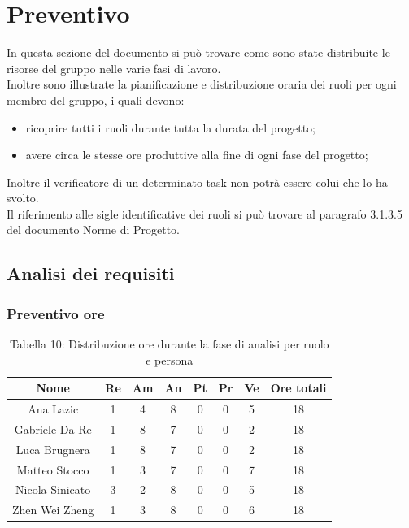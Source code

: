 \section{Preventivo}
In questa sezione del documento si può trovare come sono state distribuite le risorse del gruppo nelle varie fasi di lavoro.\\
Inoltre sono illustrate la pianificazione e distribuzione oraria dei ruoli per ogni membro del gruppo, i quali devono:
\begin{itemize}
	\item ricoprire tutti i ruoli durante tutta la durata del progetto;
	\item avere circa le stesse ore produttive alla fine di ogni fase del progetto;
\end{itemize}
Inoltre il verificatore di un determinato task non potrà essere colui che lo ha svolto.\\
Il riferimento alle sigle identificative dei ruoli si può trovare al paragrafo 3.1.3.5 del documento Norme di Progetto.

\subsection{Analisi dei requisiti}
\subsubsection{Preventivo ore}
\begin{table}[h]
	\setlength\extrarowheight{5pt}
	\centering
	\begin{tabularx}{\textwidth}{|c|c|c|c|c|c|c|c|}
		\hline
		\textbf{Nome} & \textbf{Re} & \textbf{Am} & \textbf{An} & \textbf{Pt} & \textbf{Pr}& \textbf{Ve} & \textbf{Ore totali} \\
		\hline
		Ana Lazic &1&4&8&0&0&5&18 \\
		\hline
		Gabriele Da Re &1&8&7&0&0&2&18 \\
		\hline
		Luca Brugnera &1&8&7&0&0&2&18 \\
		\hline
		Matteo Stocco &1&3&7&0&0&7&18 \\
		\hline
		Nicola Sinicato &3&2&8&0&0&5&18 \\
		\hline
		Zhen Wei Zheng &1&3&8&0&0&6&18 \\
		\hline
	\end{tabularx}
	\vspace{10pt}
	\caption{Tabella 10: Distribuzione ore durante la fase di analisi per ruolo e persona}
\end{table}


